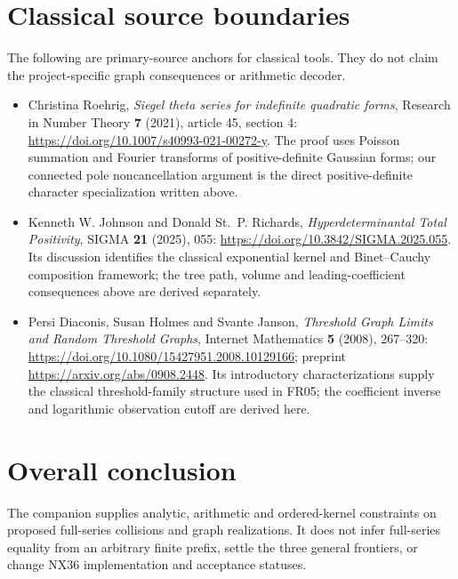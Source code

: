 \documentclass[
  11pt,
  a4paper,
]{report}
\begin{document}
\hypertarget{classical-source-boundaries}{%
\section{Classical source
boundaries}\label{classical-source-boundaries}}

The following are primary-source anchors for classical tools. They do
not claim the project-specific graph consequences or arithmetic decoder.

\begin{itemize}
\item
  Christina Roehrig, \emph{Siegel theta series for indefinite quadratic
  forms}, Research in Number Theory \textbf{7} (2021), article 45,
  section 4: \url{https://doi.org/10.1007/s40993-021-00272-y}. The proof
  uses Poisson summation and Fourier transforms of positive-definite
  Gaussian forms; our connected pole noncancellation argument is the
  direct positive-definite character specialization written above.
\item
  Kenneth W. Johnson and Donald St.~P. Richards,
  \emph{Hyperdeterminantal Total Positivity}, SIGMA \textbf{21} (2025),
  055: \url{https://doi.org/10.3842/SIGMA.2025.055}. Its discussion
  identifies the classical exponential kernel and Binet--Cauchy
  composition framework; the tree path, volume and leading-coefficient
  consequences above are derived separately.
\item
  Persi Diaconis, Susan Holmes and Svante Janson, \emph{Threshold Graph
  Limits and Random Threshold Graphs}, Internet Mathematics \textbf{5}
  (2008), 267--320:
  \url{https://doi.org/10.1080/15427951.2008.10129166}; preprint
  \url{https://arxiv.org/abs/0908.2448}. Its introductory
  characterizations supply the classical threshold-family structure used
  in FR05; the coefficient inverse and logarithmic observation cutoff
  are derived here.
\end{itemize}

\hypertarget{overall-conclusion}{%
\section{Overall conclusion}\label{overall-conclusion}}

The companion supplies analytic, arithmetic and ordered-kernel
constraints on proposed full-series collisions and graph realizations.
It does not infer full-series equality from an arbitrary finite prefix,
settle the three general frontiers, or change NX36 implementation and
acceptance statuses.
\end{document}
